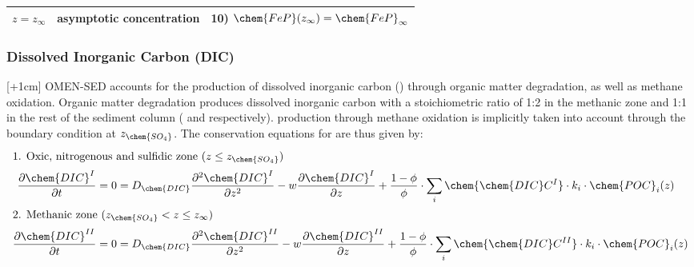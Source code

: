 \documentclass[gmd, manuscript]{copernicus}
\begin{document}
\begin{table}[tbp]
\begin{tabular}{ |l| l| l|}
$z=z_{\infty}$& asymptotic concentration & 10) $\chem{FeP}(z_\infty)=\chem{FeP}_\infty$\\
\hline    
\end{tabular}
\label{Tab:BC_PO4+M}
\end{table}


\subsubsection{Dissolved Inorganic Carbon (DIC)}\label{subsubsec:DIC}
[+1cm]%
OMEN-SED accounts for the production of dissolved inorganic carbon () through organic matter degradation, as well as methane oxidation. 
Organic matter degradation produces dissolved inorganic carbon with a stoichiometric  ratio of 1:2 in the methanic zone and 1:1 in the rest of the sediment column ( and  respectively). 
 production through methane oxidation is implicitly taken into account through the boundary condition at $z_{\chem{SO_4}}$. 
The conservation equations for  are thus given by:
\begin{align}
\intertext{1. Oxic, nitrogenous and sulfidic zone ($z \leq z_{\chem{SO_4}}$)}
  \frac{\partial \chem{DIC}^I}{\partial t} &= 0 = D_{\chem{DIC}} \frac{\partial^2\chem{DIC}^I }{\partial z^2} - w\frac{\partial \chem{DIC}^I }{\partial z} + \frac{1-\phi}{\phi} \cdot \sum_i \chem{\chem{DIC}C^I} \cdot k_i \cdot \chem{POC}_{i}(z)\label{eq:DIC_ODE1_L1}\\ %
 \intertext{2. Methanic zone ($z_{\chem{SO_4}} < z \leq z_\infty$)} 
  \frac{\partial \chem{DIC}^{II}}{\partial t} &= 0 = D_{\chem{DIC}} \frac{\partial^2\chem{DIC}^{II} }{\partial z^2} - w\frac{\partial \chem{DIC}^{II} }{\partial z} + \frac{1-\phi}{\phi} \cdot \sum_i \chem{\chem{DIC}C^{II}} \cdot k_i \cdot \chem{POC}_{i}(z)\label{eq:DIC_ODE1_L2} %
\end{align}
\end{document}
